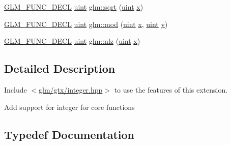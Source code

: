 \begin{DoxyCompactItemize}
\item 
\mbox{\hyperlink{setup_8hpp_ab2d052de21a70539923e9bcbf6e83a51}{G\+L\+M\+\_\+\+F\+U\+N\+C\+\_\+\+D\+E\+CL}} \mbox{\hyperlink{group__core__precision_ga4fd29415871152bfb5abd588334147c8}{uint}} \mbox{\hyperlink{group__gtx__integer_ga457e9efca8339bf918d319e9c55f7c8f}{glm\+::sqrt}} (\mbox{\hyperlink{group__core__precision_ga4fd29415871152bfb5abd588334147c8}{uint}} \mbox{\hyperlink{_s_d_l__opengl_8h_ad0e63d0edcdbd3d79554076bf309fd47}{x}})
\item 
\mbox{\hyperlink{setup_8hpp_ab2d052de21a70539923e9bcbf6e83a51}{G\+L\+M\+\_\+\+F\+U\+N\+C\+\_\+\+D\+E\+CL}} \mbox{\hyperlink{group__core__precision_ga4fd29415871152bfb5abd588334147c8}{uint}} \mbox{\hyperlink{group__gtx__integer_gab8f9ec0ca93ca90669434224818f0750}{glm\+::mod}} (\mbox{\hyperlink{group__core__precision_ga4fd29415871152bfb5abd588334147c8}{uint}} \mbox{\hyperlink{_s_d_l__opengl_8h_ad0e63d0edcdbd3d79554076bf309fd47}{x}}, \mbox{\hyperlink{group__core__precision_ga4fd29415871152bfb5abd588334147c8}{uint}} \mbox{\hyperlink{_s_d_l__opengl_8h_a1675d9d7bb68e1657ff028643b4037e3}{y}})
\item 
\mbox{\hyperlink{setup_8hpp_ab2d052de21a70539923e9bcbf6e83a51}{G\+L\+M\+\_\+\+F\+U\+N\+C\+\_\+\+D\+E\+CL}} \mbox{\hyperlink{group__core__precision_ga4fd29415871152bfb5abd588334147c8}{uint}} \mbox{\hyperlink{group__gtx__integer_gacbe62fd2384464c16ea30ecc4defc11c}{glm\+::nlz}} (\mbox{\hyperlink{group__core__precision_ga4fd29415871152bfb5abd588334147c8}{uint}} \mbox{\hyperlink{_s_d_l__opengl_8h_ad0e63d0edcdbd3d79554076bf309fd47}{x}})
\end{DoxyCompactItemize}


\subsection{Detailed Description}
Include $<$\mbox{\hyperlink{gtx_2integer_8hpp}{glm/gtx/integer.\+hpp}}$>$ to use the features of this extension.

Add support for integer for core functions 

\subsection{Typedef Documentation}
\mbox{\label{group__gtx__integer_ga73643e09d8c6d362418aec541fdb987d}} 
